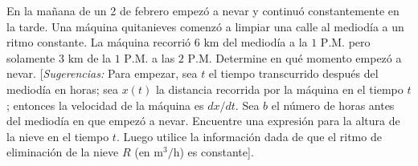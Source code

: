 \item En la mañana de un 2 de febrero empezó a nevar y continuó constantemente en la tarde. Una máquina quitanieves comenzó a limpiar una calle al mediodía a un ritmo constante. La máquina recorrió $6 \text{ km}$ del mediodía a la $1 \text{ P.M.}$ pero solamente $3 \text{ km}$ de la $1 \text{ P.M.}$ a las $2 \text{ P.M.}$ Determine en qué momento empezó a nevar. [\textit{Sugerencias:} Para empezar, sea $t$ el tiempo transcurrido después del mediodía en horas; sea $x(t)$ la distancia recorrida por la máquina en el tiempo $t$; entonces la velocidad de la máquina es $dx/dt$. Sea $b$ el número de horas antes del mediodía en que empezó a nevar. Encuentre una expresión para la altura de la nieve en el tiempo $t$. Luego utilice la información dada de que el ritmo de eliminación de la nieve $R$ (en $\text{m}^3/\text{h}$) es constante].
